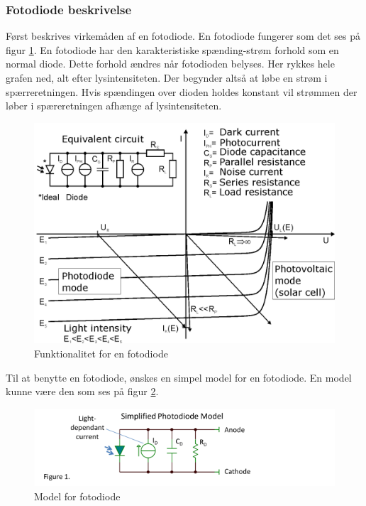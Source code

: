 \documentclass[HardwareDesign/HardwareDesign_main.tex]{subfiles}
\begin{document}
\subsubsection{Fotodiode beskrivelse}
Først beskrives virkemåden af en fotodiode. En fotodiode fungerer som det ses på figur \ref{fig:photodiode_operation}. En fotodiode har den karakteristiske spænding-strøm forhold som en normal diode. Dette forhold ændres når fotodioden belyses. Her rykkes hele grafen ned, alt efter lysintensiteten. Der begynder altså at løbe en strøm i spærreretningen. Hvis spændingen over dioden holdes konstant vil strømmen der løber i spæreretningen afhænge af lysintensiteten. 
\begin{figure}[H]
    \centering
    \includegraphics[width=\textwidth]{HardwareDesign/CupSensor/graphics/Photodiode_operation.png}
    \caption{Funktionalitet for en fotodiode}
    \label{fig:photodiode_operation}
\end{figure}

Til at benytte en fotodiode, ønskes en simpel model for en fotodiode. En model kunne være den som ses på figur \ref{fig:photodiodeModel}.

\begin{figure}[H]
    \centering
    \includegraphics[width=\textwidth]{HardwareDesign/CupSensor/graphics/photodiodeModel.png}
    \caption{Model for fotodiode}
    \label{fig:photodiodeModel}
\end{figure}
\end{document}
